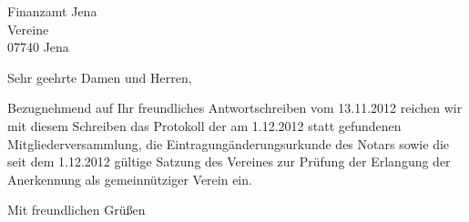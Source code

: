 \documentclass[fontsize=12pt,paper=a4,DIN]{scrlttr2}
\begin{document}


\begin{letter}{Finanzamt Jena \\
Vereine\\
07740 Jena}


\opening{Sehr geehrte Damen und Herren,}

Bezugnehmend auf Ihr freundliches Antwortschreiben vom 13.11.2012 
reichen wir mit diesem Schreiben das Protokoll der am 1.12.2012 
statt gefundenen Mitgliederversammlung, die 
Eintragungänderungsurkunde des Notars sowie die seit dem 1.12.2012 
gültige Satzung des Vereines zur Prüfung der Erlangung der 
Anerkennung als gemeinnütziger Verein ein. 


\closing{Mit freundlichen Grüßen}
\end{letter}
\end{document}
